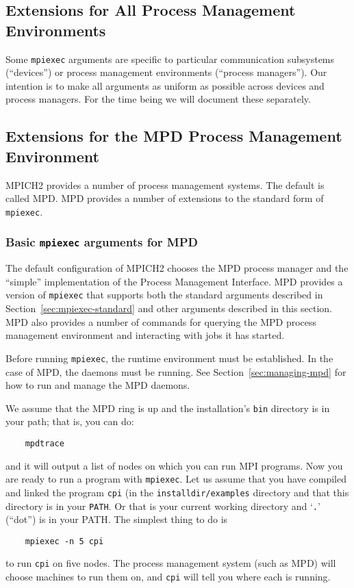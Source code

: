 \documentclass[dvipdfm,11pt]{article}
\begin{document}
\subsection{Extensions for All Process Management Environments}
\label{sec:extensions-uniform}

Some \texttt{mpiexec} arguments are specific to particular communication
subsystems (``devices'') or process management environments (``process
managers'').  Our intention is to make all arguments as uniform as
possible across devices and process managers.  For the time being we
will document these separately.

\subsection{Extensions for the MPD Process Management Environment}
\label{sec:extensions-various}

MPICH2 provides a number of process management systems.  The default is
called MPD.  MPD provides a number of extensions to the standard form of
\texttt{mpiexec}.

\subsubsection{Basic \texttt{mpiexec} arguments for MPD}
\label{sec:extensions-mpd}

The default configuration of MPICH2 chooses the MPD process manager and
the ``simple'' implementation of the Process Management Interface.
MPD provides a version of
\texttt{mpiexec} that supports both the standard arguments described in
Section~\ref{sec:mpiexec-standard} and other arguments described in this
section.  MPD also provides a number of commands for querying the MPD
process management environment and interacting with jobs it has started. 

Before running \texttt{mpiexec}, the runtime environment must be
established.  In the case of MPD, the daemons must be running.  See
Section~\ref{sec:managing-mpd} for how to run and manage the MPD daemons.

We assume that the MPD ring is up and the installation's \texttt{bin}
directory is in your path; that is, you can do:
\begin{verbatim}
    mpdtrace
\end{verbatim}
and it will output a list of nodes on which you can run MPI programs.
Now you are ready to run a program with \texttt{mpiexec}.  Let us assume
that you have compiled and linked the program \texttt{cpi} (in the
\texttt{installdir/examples} directory and that this directory is in your
\texttt{PATH}.  Or that is your current working directory and
`\texttt{.}' (``dot'') is in your PATH.   The simplest thing to do is
\begin{verbatim}
    mpiexec -n 5 cpi
\end{verbatim}
to run \texttt{cpi} on five nodes.  The process management system (such
as MPD) will choose machines to run them on, and \texttt{cpi} will tell
you where each is running.  
\end{document}
